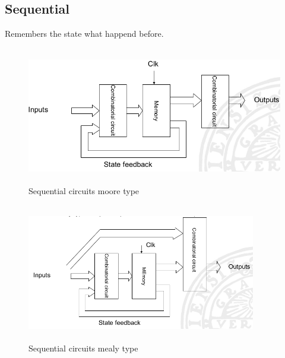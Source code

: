 \newpage
\subsection{Sequential}
Remembers the state what happend before.

\begin{figure}[h]
    \centering
    \includegraphics[width=12cm, height=6cm]{image/sequential-circuits-moore-type.png}
    \caption{Sequential circuits moore type}
\end{figure}

\begin{figure}[h]
    \vspace{10mm}
    \centering
    \includegraphics[width=10cm, height=6cm]{image/sequential-circuits-mealy-type.png}
    \caption{Sequential circuits mealy type}
\end{figure}

\newpage
